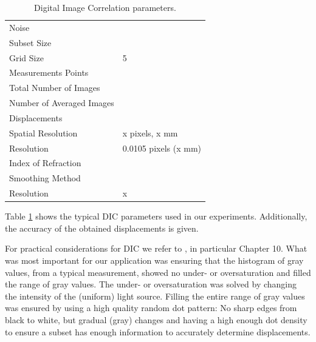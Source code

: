 \documentclass{svjour3}                     %
\begin{document}
\begin{table}[htbp]
\caption{Digital Image Correlation parameters.}
\label{tab:esterrmagn}
\centering
\begin{tabular}{ll}
Noise & \\
Subset Size & \\
Grid Size 	& 5 \\
Measurements Points & \\
Total Number of Images & \\
Number of Averaged Images & \\
Displacements & \\
\qquad Spatial Resolution & x pixels, x mm \\
\qquad Resolution & 0.0105 pixels (x mm) \\
Index of Refraction & \\
\qquad Smoothing Method & \\
\qquad Resolution & x \\
\end{tabular}
\end{table}

Table \ref{tab:esterrmagn} shows the typical DIC parameters used in our experiments. Additionally, the accuracy of the obtained displacements is given.

For practical considerations for DIC we refer to \cite{sutton2009image}, in particular Chapter 10. What was most important for our application was ensuring that the histogram of gray values, from a typical measurement, showed no under- or oversaturation and filled the range of gray values. The under- or oversaturation was solved by changing the intensity of the (uniform) light source. Filling the entire range of gray values was ensured by using a high quality random dot pattern: No sharp edges from black to white, but gradual (gray) changes and having a high enough dot density to ensure a subset has enough information to accurately determine displacements. %
\end{document}
